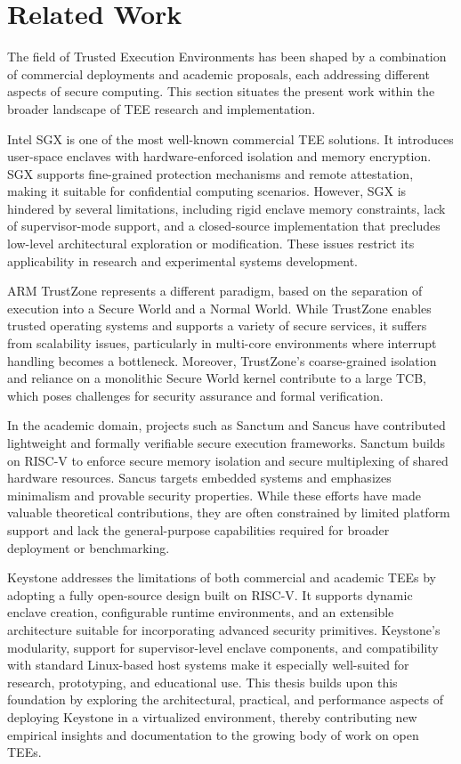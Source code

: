 \section{Related Work}

The field of Trusted Execution Environments has been shaped by a combination of commercial deployments and academic proposals, each addressing different aspects of secure computing. This section situates the present work within the broader landscape of TEE research and implementation.

Intel SGX is one of the most well-known commercial TEE solutions. It introduces user-space enclaves with hardware-enforced isolation and memory encryption. SGX supports fine-grained protection mechanisms and remote attestation, making it suitable for confidential computing scenarios. However, SGX is hindered by several limitations, including rigid enclave memory constraints, lack of supervisor-mode support, and a closed-source implementation that precludes low-level architectural exploration or modification. These issues restrict its applicability in research and experimental systems development.

ARM TrustZone represents a different paradigm, based on the separation of execution into a Secure World and a Normal World. While TrustZone enables trusted operating systems and supports a variety of secure services, it suffers from scalability issues, particularly in multi-core environments where interrupt handling becomes a bottleneck. Moreover, TrustZone's coarse-grained isolation and reliance on a monolithic Secure World kernel contribute to a large TCB, which poses challenges for security assurance and formal verification.

In the academic domain, projects such as Sanctum and Sancus have contributed lightweight and formally verifiable secure execution frameworks. Sanctum builds on RISC-V to enforce secure memory isolation and secure multiplexing of shared hardware resources. Sancus targets embedded systems and emphasizes minimalism and provable security properties. While these efforts have made valuable theoretical contributions, they are often constrained by limited platform support and lack the general-purpose capabilities required for broader deployment or benchmarking.

Keystone addresses the limitations of both commercial and academic TEEs by adopting a fully open-source design built on RISC-V. It supports dynamic enclave creation, configurable runtime environments, and an extensible architecture suitable for incorporating advanced security primitives. Keystone’s modularity, support for supervisor-level enclave components, and compatibility with standard Linux-based host systems make it especially well-suited for research, prototyping, and educational use. This thesis builds upon this foundation by exploring the architectural, practical, and performance aspects of deploying Keystone in a virtualized environment, thereby contributing new empirical insights and documentation to the growing body of work on open TEEs.

